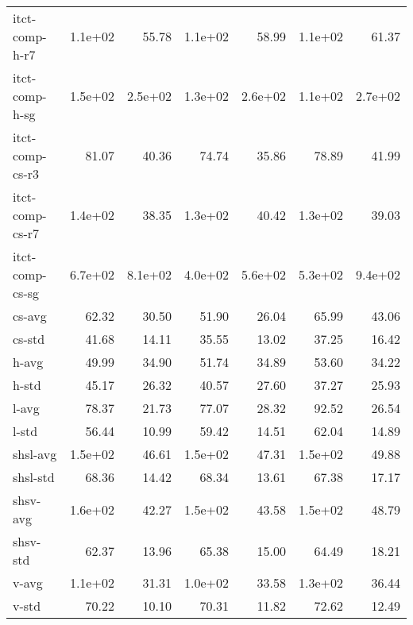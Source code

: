 \begin{tabular}{lrrrrrr}
itct-comp-h-r7      & 1.1e+02 &   55.78 & 1.1e+02 &   58.99 & 1.1e+02 &   61.37 \\
itct-comp-h-sg      & 1.5e+02 & 2.5e+02 & 1.3e+02 & 2.6e+02 & 1.1e+02 & 2.7e+02 \\
itct-comp-cs-r3     &   81.07 &   40.36 &   74.74 &   35.86 &   78.89 &   41.99 \\
itct-comp-cs-r7     & 1.4e+02 &   38.35 & 1.3e+02 &   40.42 & 1.3e+02 &   39.03 \\
itct-comp-cs-sg     & 6.7e+02 & 8.1e+02 & 4.0e+02 & 5.6e+02 & 5.3e+02 & 9.4e+02 \\
cs-avg              &   62.32 &   30.50 &   51.90 &   26.04 &   65.99 &   43.06 \\
cs-std              &   41.68 &   14.11 &   35.55 &   13.02 &   37.25 &   16.42 \\
h-avg               &   49.99 &   34.90 &   51.74 &   34.89 &   53.60 &   34.22 \\
h-std               &   45.17 &   26.32 &   40.57 &   27.60 &   37.27 &   25.93 \\
l-avg               &   78.37 &   21.73 &   77.07 &   28.32 &   92.52 &   26.54 \\
l-std               &   56.44 &   10.99 &   59.42 &   14.51 &   62.04 &   14.89 \\
shsl-avg            & 1.5e+02 &   46.61 & 1.5e+02 &   47.31 & 1.5e+02 &   49.88 \\
shsl-std            &   68.36 &   14.42 &   68.34 &   13.61 &   67.38 &   17.17 \\
shsv-avg            & 1.6e+02 &   42.27 & 1.5e+02 &   43.58 & 1.5e+02 &   48.79 \\
shsv-std            &   62.37 &   13.96 &   65.38 &   15.00 &   64.49 &   18.21 \\
v-avg               & 1.1e+02 &   31.31 & 1.0e+02 &   33.58 & 1.3e+02 &   36.44 \\
v-std               &   70.22 &   10.10 &   70.31 &   11.82 &   72.62 &   12.49 \\
\bottomrule
\end{tabular}
